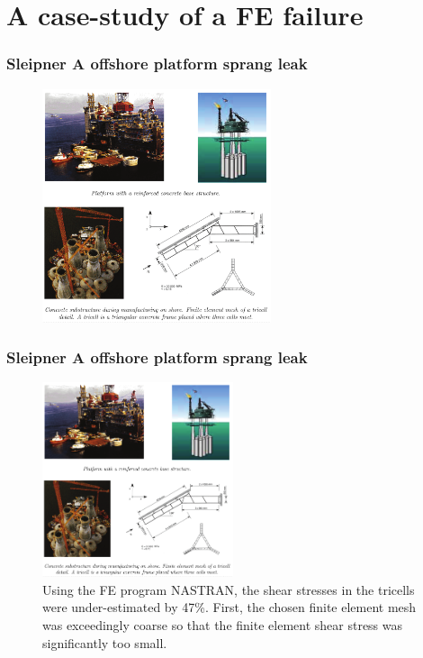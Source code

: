 \documentclass[notes]{beamer}
\begin{document}

\section{A case-study of a FE failure}
\begin{frame}
\frametitle{Sleipner A offshore platform sprang leak}
	\begin{figure}
	\centering
	\includegraphics[width=0.6\textwidth]{figs/sleipner.png}
\end{figure}
\end{frame}

\begin{frame}
\frametitle{Sleipner A offshore platform sprang leak}
\begin{figure}
	\centering
	\includegraphics[width=0.5\textwidth]{figs/sleipner.png}
	\caption*{Using the FE program NASTRAN, the shear stresses in the tricells were under-estimated by 47\%. First, the chosen finite element mesh was exceedingly coarse so that the finite element shear stress was significantly too small.}
\end{figure}
\end{frame}
\end{document}
